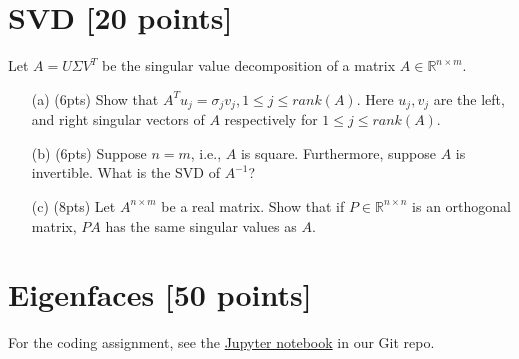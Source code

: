 \section{SVD [20 points]} 

Let $A=U\Sigma V^T$ be the singular value decomposition of a matrix $A \in \mathbb{R}^{n \times m}$. 
 
 \begin{itemize}
 	
 	
 	\item[(a)](6pts)  Show that $A^T u_j = \sigma_j v_j, 1\leq j \leq rank(A)$. Here $u_j, v_j$ are the left, and right singular vectors of $A$ respectively  for $1\leq j \leq rank(A)$.
 	
 	\item[(b)](6pts) Suppose $n=m$, i.e., $A$ is square. Furthermore, suppose $A$ is invertible. What is the SVD of $A^{-1}$? 
 	
 	
 	\item[(c)](8pts)  Let $A^{n \times m}$ be a real matrix. Show that if $P \in \mathbb{R}^{n \times n}$ is an orthogonal matrix, $PA$ has the same singular values as $A$. \\ 
 	
\end{itemize}

 
\section{Eigenfaces [50 points]} 

For the coding assignment, see the  \href{https://github.com/tsourolampis/cs365-spring22/blob/main/hws/hw8/PA8-STUDENT.ipynb}{Jupyter notebook} in our Git repo. 

